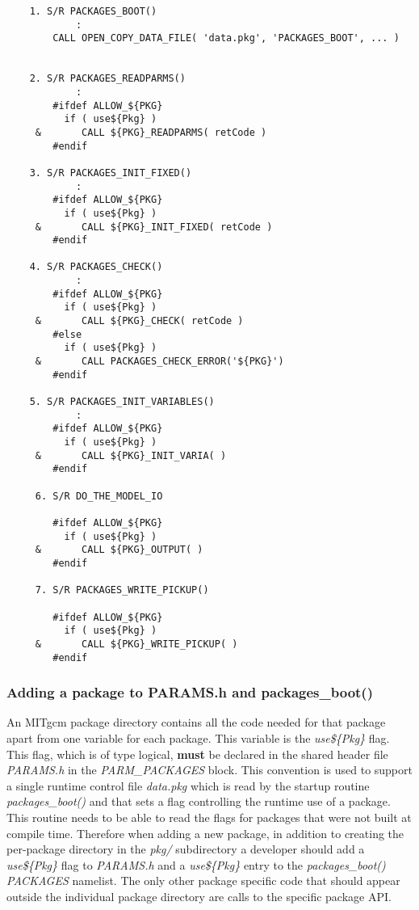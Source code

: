 {\footnotesize
\begin{verbatim}
    1. S/R PACKAGES_BOOT()
            :
        CALL OPEN_COPY_DATA_FILE( 'data.pkg', 'PACKAGES_BOOT', ... )
 

    2. S/R PACKAGES_READPARMS()
            :
        #ifdef ALLOW_${PKG}
          if ( use${Pkg} )
     &       CALL ${PKG}_READPARMS( retCode )
        #endif

    3. S/R PACKAGES_INIT_FIXED()
            :
        #ifdef ALLOW_${PKG}
          if ( use${Pkg} )
     &       CALL ${PKG}_INIT_FIXED( retCode )
        #endif

    4. S/R PACKAGES_CHECK()
            :
        #ifdef ALLOW_${PKG}
          if ( use${Pkg} )
     &       CALL ${PKG}_CHECK( retCode )
        #else
          if ( use${Pkg} )
     &       CALL PACKAGES_CHECK_ERROR('${PKG}')
        #endif

    5. S/R PACKAGES_INIT_VARIABLES()
            :
        #ifdef ALLOW_${PKG}
          if ( use${Pkg} )
     &       CALL ${PKG}_INIT_VARIA( )
        #endif

     6. S/R DO_THE_MODEL_IO

        #ifdef ALLOW_${PKG}
          if ( use${Pkg} )
     &       CALL ${PKG}_OUTPUT( )
        #endif

     7. S/R PACKAGES_WRITE_PICKUP()

        #ifdef ALLOW_${PKG}
          if ( use${Pkg} )
     &       CALL ${PKG}_WRITE_PICKUP( )
        #endif\end{verbatim}
}


\subsubsection{Adding a package to PARAMS.h and  packages\_boot()}

An MITgcm package directory contains all the code needed for that package apart
from one variable for each package. This variable is the {\it use\$\{Pkg\} } 
flag. This flag, which is of type logical, {\bf must} be declared in the 
shared header file {\it PARAMS.h} in the {\it PARM\_PACKAGES} block. This 
convention is used to support a single runtime control file {\it data.pkg} 
which is read by the startup routine {\it packages\_boot()} and that sets a 
flag controlling the runtime use of a package. This routine needs to be able to 
read the flags for packages that were not built at compile time. Therefore
when adding a new package, in addition to creating the per-package directory
in the {\it pkg/} subdirectory a developer should add a {\it use\$\{Pkg\} }
flag to {\it PARAMS.h} and a {\it use\$\{Pkg\} } entry to the 
{\it packages\_boot()} {\it PACKAGES} namelist.
The only other package specific code that should appear outside the individual 
package directory are calls to the specific package API.


